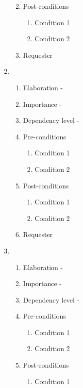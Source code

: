 \documentclass[12pt]{article}
\begin{document}
\begin{enumerate}
\begin{enumerate}
\begin{enumerate}
    \end{enumerate}
        \item Post-conditions
    \begin{enumerate}
    	\item Condition 1
    	\item Condition 2
    \end{enumerate}
    \item Requester
  \end{enumerate}
\newpage %
   \item  %
  \begin{enumerate}
    \item Elaboration - 
    \item Importance - 
    \item Dependency level - 
    \item Pre-conditions
    \begin{enumerate}
    	\item Condition 1
    	\item Condition 2
    \end{enumerate}
        \item Post-conditions
    \begin{enumerate}
    	\item Condition 1
    	\item Condition 2
    \end{enumerate}
    \item Requester
  \end{enumerate}
\newpage %
   \item  %
  \begin{enumerate}
    \item Elaboration - 
    \item Importance - 
    \item Dependency level - 
    \item Pre-conditions
    \begin{enumerate}
    	\item Condition 1
    	\item Condition 2
    \end{enumerate}
        \item Post-conditions
    \begin{enumerate}
    	\item Condition 1

\end{enumerate}
\end{enumerate}
\end{enumerate}
\end{document}
